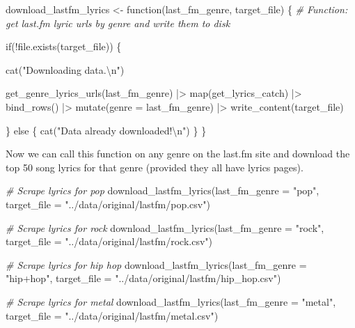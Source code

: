 \documentclass[
  letterpaper,
]{latex/krantz}
\newenvironment{Shaded}{\begin{snugshade}}{\end{snugshade}}
\newcommand{\AttributeTok}[1]{\textcolor[rgb]{0.00,0.00,0.00}{#1}}
\newcommand{\CommentTok}[1]{\textcolor[rgb]{0.00,0.00,0.00}{\textit{#1}}}
\newcommand{\ControlFlowTok}[1]{\textcolor[rgb]{0.00,0.00,0.00}{#1}}
\newcommand{\FunctionTok}[1]{\textcolor[rgb]{0.00,0.00,0.00}{#1}}
\newcommand{\NormalTok}[1]{\textcolor[rgb]{0.00,0.00,0.00}{#1}}
\newcommand{\OtherTok}[1]{\textcolor[rgb]{0.00,0.00,0.00}{#1}}
\newcommand{\SpecialCharTok}[1]{\textcolor[rgb]{0.00,0.00,0.00}{#1}}
\newcommand{\StringTok}[1]{\textcolor[rgb]{0.00,0.00,0.00}{#1}}
\begin{document}
\begin{Shaded}
\begin{Highlighting}[]
\NormalTok{download\_lastfm\_lyrics }\OtherTok{\textless{}{-}} \ControlFlowTok{function}\NormalTok{(last\_fm\_genre, target\_file) \{}
  \CommentTok{\# Function: get last.fm lyric urls by genre and write them to disk}
  
  \ControlFlowTok{if}\NormalTok{(}\SpecialCharTok{!}\FunctionTok{file.exists}\NormalTok{(target\_file)) \{}
    
    \FunctionTok{cat}\NormalTok{(}\StringTok{"Downloading data.}\SpecialCharTok{\textbackslash{}n}\StringTok{"}\NormalTok{)}
    
    \FunctionTok{get\_genre\_lyrics\_urls}\NormalTok{(last\_fm\_genre) }\SpecialCharTok{|\textgreater{}} 
      \FunctionTok{map}\NormalTok{(get\_lyrics\_catch) }\SpecialCharTok{|\textgreater{}} 
      \FunctionTok{bind\_rows}\NormalTok{() }\SpecialCharTok{|\textgreater{}} 
      \FunctionTok{mutate}\NormalTok{(}\AttributeTok{genre =}\NormalTok{ last\_fm\_genre) }\SpecialCharTok{|\textgreater{}} 
      \FunctionTok{write\_content}\NormalTok{(target\_file)}
    
\NormalTok{  \} }\ControlFlowTok{else}\NormalTok{ \{}
    \FunctionTok{cat}\NormalTok{(}\StringTok{"Data already downloaded!}\SpecialCharTok{\textbackslash{}n}\StringTok{"}\NormalTok{)}
\NormalTok{  \}}
\NormalTok{\}}
\end{Highlighting}
\end{Shaded}

Now we can call this function on any genre on the last.fm site and
download the top 50 song lyrics for that genre (provided they all have
lyrics pages).

\begin{Shaded}
\begin{Highlighting}[]
\CommentTok{\# Scrape lyrics for \textquotesingle{}pop\textquotesingle{}}
\FunctionTok{download\_lastfm\_lyrics}\NormalTok{(}\AttributeTok{last\_fm\_genre =} \StringTok{"pop"}\NormalTok{, }\AttributeTok{target\_file =} \StringTok{"../data/original/lastfm/pop.csv"}\NormalTok{)}

\CommentTok{\# Scrape lyrics for \textquotesingle{}rock\textquotesingle{}}
\FunctionTok{download\_lastfm\_lyrics}\NormalTok{(}\AttributeTok{last\_fm\_genre =} \StringTok{"rock"}\NormalTok{, }\AttributeTok{target\_file =} \StringTok{"../data/original/lastfm/rock.csv"}\NormalTok{)}

\CommentTok{\# Scrape lyrics for \textquotesingle{}hip hop\textquotesingle{}}
\FunctionTok{download\_lastfm\_lyrics}\NormalTok{(}\AttributeTok{last\_fm\_genre =} \StringTok{"hip+hop"}\NormalTok{, }\AttributeTok{target\_file =} \StringTok{"../data/original/lastfm/hip\_hop.csv"}\NormalTok{)}

\CommentTok{\# Scrape lyrics for \textquotesingle{}metal\textquotesingle{}}
\FunctionTok{download\_lastfm\_lyrics}\NormalTok{(}\AttributeTok{last\_fm\_genre =} \StringTok{"metal"}\NormalTok{, }\AttributeTok{target\_file =} \StringTok{"../data/original/lastfm/metal.csv"}\NormalTok{)}
\end{Highlighting}
\end{Shaded}
\end{document}
